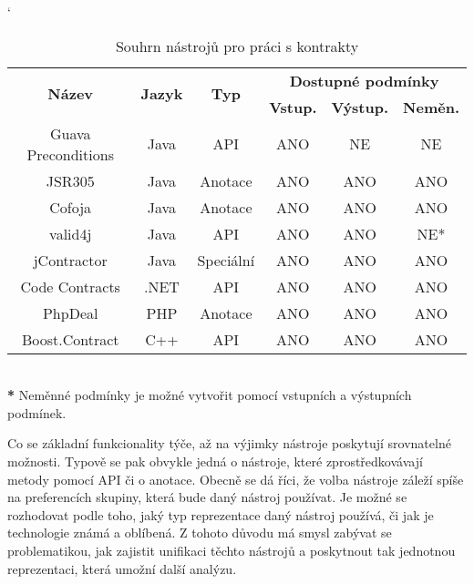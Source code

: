 		\begin{table}[H]
		\catcode`
		\begin{tabular}{|c||c|c|c|c|c|}
			\hline
			\multirow{2}{*}{\bf Název} & \multirow{2}{*}{\bf Jazyk} & \multirow{2}{*}{\bf Typ} & \multicolumn{3}{c|}{\bf Dostupné podmínky}\\
				\cline{4-6}
					& & & {\bf Vstup.} & {\bf Výstup.} & {\bf Neměn.}\\
				\hline
				\hline
					  Guava Preconditions & Java & API & ANO & NE & NE\\
					  JSR305 & Java & Anotace & ANO & ANO & ANO\\
					  Cofoja & Java & Anotace & ANO & ANO & ANO\\
					  valid4j & Java & API & ANO & ANO & NE*\\
					  jContractor & Java & Speciální & ANO & ANO & ANO\\
					  Code Contracts & .NET & API & ANO & ANO & ANO\\
					  PhpDeal & PHP & Anotace & ANO & ANO & ANO\\					  
					  Boost.Contract & C++ & API & ANO & ANO & ANO\\
				\hline
		\end{tabular}\\
		
		\footnotesize
			\- \- \- \textbf{*} Neměnné podmínky je možné vytvořit pomocí vstupních a výstupních podmínek.
					
		\caption{Souhrn nástrojů pro práci s kontrakty}
		\label{table:tabContracts}
		\end{table}		
		
		\normalsize	
			
		Co se základní funkcionality týče, až na výjimky nástroje poskytují srovnatelné možnosti. Typově se pak obvykle jedná o nástroje, které zprostředkovávají metody pomocí API či o anotace. Obecně se dá říci, že volba nástroje záleží spíše na preferencích skupiny, která bude daný nástroj používat. Je možné se rozhodovat podle toho, jaký typ reprezentace daný nástroj používá, či jak je technologie známá a oblíbená. Z tohoto důvodu má smysl zabývat se problematikou, jak zajistit unifikaci těchto nástrojů a poskytnout tak jednotnou reprezentaci, která umožní další analýzu. 